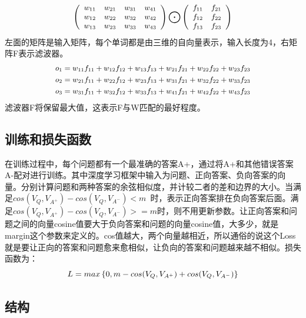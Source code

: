 \documentclass{article}
\begin{document}
\begin{equation}
\label{eq:input_filter}
\small
\left( \begin{array}{cccc}
w_{11} & w_{21} & w_{31} & w_{41} \\
w_{12} & w_{22} & w_{32} & w_{42} \\
w_{13} & w_{23} & w_{33} & w_{43} \end{array}\right)  \bigodot
 \left( \begin{array}{cc}
f_{11} & f_{21}  \\
f_{12} & f_{22}  \\
f_{13} & f_{23} \end{array}
 \right)
\end{equation}
左面的矩阵是输入矩阵，每个单词都是由三维的自向量表示，输入长度为4，右矩阵F表示滤波器。
\begin{equation}
\label{eq:convout}
\small
\begin{aligned}
o_1 &= w_{11}f_{11} + w_{12}f_{12} + w_{13}f_{13} +w_{21}f_{21} + w_{22}f_{22} + w_{23}f_{23} \\ 
o_2 &= w_{21}f_{11} + w_{22}f_{12} + w_{23}f_{13} +w_{31}f_{21} + w_{32}f_{22} + w_{33}f_{23} \\
o_3 &= w_{31}f_{11} + w_{32}f_{12} + w_{33}f_{13} +w_{41}f_{21} + w_{42}f_{22} + w_{43}f_{23} \\
\end{aligned}
\end{equation}
滤波器F将保留最大值，这表示F与W匹配的最好程度。

\subsection{训练和损失函数}
在训练过程中，每个问题都有一个最准确的答案A+，通过将A+和其他错误答案A-配对进行训练。其中深度学习框架中输入为问题、正向答案、负向答案的向量。分别计算问题和两种答案的余弦相似度，并计较二者的差和边界的大小。当满足{\small$cos(V_{Q},V_{A^+}) - cos(V_{Q},V_{A^-}) < m$}~时，表示正向答案排在负向答案后面。满足{\small$cos(V_{Q},V_{A^+}) - cos(V_{Q},V_{A^-}) >= m$}时，则不用更新参数。让正向答案和问题之间的向量cosine值要大于负向答案和问题的向量cosine值，大多少，就是margin这个参数来定义的。cos值越大，两个向量越相近，所以通俗的说这个Loss就是要让正向的答案和问题愈来愈相似，让负向的答案和问题越来越不相似。损失函数为：
\begin{equation}
\small
L = max\left\{0, m - cos(V_{Q},V_{A^+}) +cos(V_{Q},V_{A^-}) \right\}
\end{equation}


\subsection{结构}
\end{document}

